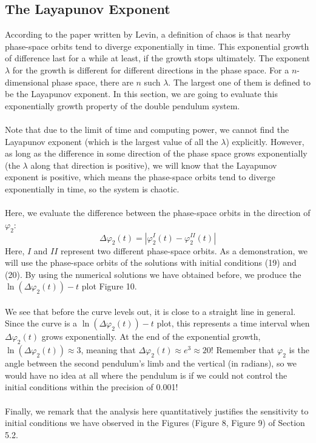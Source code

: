 \documentclass[11pt]{article}
\begin{document}
\subsection{The Layapunov Exponent}
According to the paper written by Levin\cite{Levin}, a definition of chaos is that nearby phase-space orbits tend to diverge
exponentially in time.
This exponential growth of difference last for a while at least,
if the growth stops ultimately\cite{Taylor}.
The exponent \(\lambda\) for the growth is different for different directions in the phase space.
For a \(n\)-dimensional phase space, there are \(n\) such \(\lambda\)\cite{Levin}.
The largest one of them is defined to be the Layapunov exponent\cite{Taylor}.
In this section, we are going to evaluate this exponentially growth property of the double pendulum system. \\
\\
Note that due to the limit of time and computing power, we cannot find the Layapunov exponent (which is the largest value of all the
\(\lambda\)) explicitly. However, as long as the difference in some direction of the phase space
grows exponentially (the \(\lambda\) along that direction is positive), we will know that the Layapunov exponent is positive, which means the phase-space orbits tend to diverge
exponentially in time, so the system is chaotic. \\
\\
Here, we evaluate the difference between the phase-space orbits in the direction of \(\varphi_2\):
\begin{equation}
  \Delta\varphi_2(t) = |\varphi_2^{I}(t) - \varphi_2^{II}(t)|
\end{equation}
Here, \(I\) and \(II\) represent two different phase-space orbits. As a demonstration, we will use the phase-space orbits
of the solutions with initial conditions (19) and (20). By using the numerical solutions we have obtained before, we produce
the \(\ln(\Delta\varphi_2(t))- t \) plot Figure 10. \\
\\
We see that before the curve levels out, it is close to a straight line in general. Since the curve is a \(\ln(\Delta\varphi_2(t))- t \) plot, this represents a time interval when \(\Delta\varphi_2(t)\) grows exponentially. At the end of the exponential
growth, \(\ln(\Delta\varphi_2(t))\approx 3\), meaning that \(\Delta\varphi_2(t)\approx e^3  \approx 20\)!
Remember that \(\varphi_2\) is the angle between the second pendulum's limb and the vertical (in radians), so we would have
no idea at all where the pendulum is if we could not control the initial conditions within the precision of 0.001! \\
\\
Finally, we remark that the analysis here quantitatively justifies the sensitivity to initial conditions we have
observed in the Figures (Figure 8, Figure 9) of Section 5.2.
\end{document}
